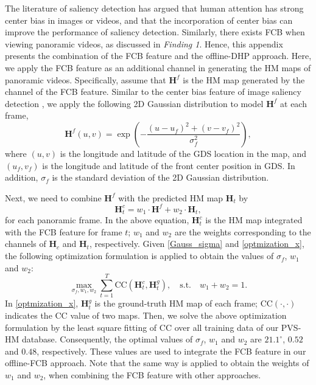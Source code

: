 \documentclass[10pt,journal,compsoc]{IEEEtran}
\begin{document}
The literature of saliency detection \cite{judd2009learning} has argued that human attention has strong center bias in images or videos, and that the incorporation of center bias can improve the performance of saliency detection. Similarly, there exists FCB when viewing panoramic videos, as discussed in \textit{Finding 1}. Hence, this appendix presents the combination of the FCB feature and the offline-DHP approach. Here, we apply the FCB feature as an additional channel in generating the HM maps of panoramic videos. Specifically, assume that $\mathbf{H}^f$ is the HM map generated by the channel of the FCB feature. Similar to the center bias feature of image saliency detection \cite{judd2009learning}, we apply the following 2D Gaussian distribution to model $\mathbf{H}^f$ at each frame,
\begin{equation}
\label{Gauss_sigma}
\mathbf{H}^f(u,v)= \exp\left({-\frac{(u-u_f)^2+(v-v_f)^2}{\sigma_f^2}}\right),
\end{equation}
where $(u,v)$ is the longitude and latitude of the GDS location in the map, and $(u_f,v_f)$ is the longitude and latitude of the front center position in GDS. In addition, $\sigma_f$ is the standard deviation of  the 2D Gaussian distribution.

Next, we need to combine $\mathbf{H}^f$ with the predicted HM map $\mathbf{H}_t$ by
\begin{equation}
\label{optmization_x}
\mathbf{H}^c_t = w_1\cdot \mathbf{H}^f+w_2\cdot \mathbf{H}_t,
\end{equation}
for each panoramic frame. In the above equation, $\mathbf{H}^c_t$ is the HM map integrated with the FCB feature for frame $t$; $w_1$ and $w_2$ are the weights corresponding to the channels of $\mathbf{H}_c$ and $\mathbf{H}_t$, respectively. Given \eqref{Gauss_sigma} and \eqref{optmization_x}, the following optimization formulation is applied to obtain the values of $\sigma_f$, $w_1$ and $w_2$:
\begin{equation}
\label{optmization_w}
\max_{\sigma_f,w_1,w_2} \sum_{t=1}^{T} \text{CC}(\mathbf{H}^c_t, \mathbf{H}^g_t), \quad \text{s.t.} \quad w_1+w_2=1.
\end{equation}
In \eqref{optmization_x}, $\mathbf{H}^g_t$ is the ground-truth HM map of each frame; $\text{CC}(\cdot,\cdot)$ indicates the CC value of two maps. Then, we solve the above optimization formulation by the least square fitting of CC over all training data of our PVS-HM database. Consequently, the optimal values of $\sigma_f$, $w_1$ and $w_2$ are $21.1^\circ$, $0.52$ and $0.48$, respectively. These values are used to integrate the FCB feature in our offline-FCB approach. Note that the same way is applied to obtain the weights of $w_1$ and $w_2$, when combining the FCB feature with other approaches.
\end{document}

